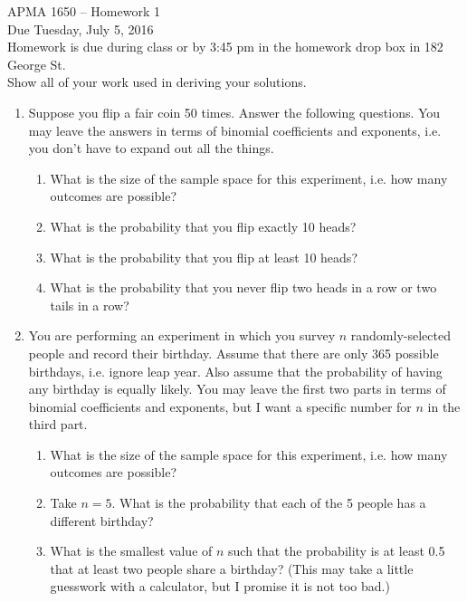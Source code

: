 \documentclass[12pt]{article}
\begin{document}
\title{}
\author{\vspace{-10ex} }

\begin{center}
{\LARGE APMA 1650 -- Homework 1}\\
\vspace{5mm}
{\large Due Tuesday, July 5, 2016}\\
\vspace{5mm}
Homework is due during class or by 3:45 pm in the homework drop box in 182 George St.\\
Show all of your work used in deriving your solutions.
\end{center}

\begin{enumerate}
\item Suppose you flip a fair coin 50 times. Answer the following questions. You may leave the answers in terms of binomial coefficients and exponents, i.e. you don't have to expand out all the things.
\begin{enumerate}
\item What is the size of the sample space for this experiment, i.e. how many outcomes are possible?
\item What is the probability that you flip exactly 10 heads?
\item What is the probability that you flip at least 10 heads?
\item What is the probability that you never flip two heads in a row or two tails in a row?
\end{enumerate}

\item You are performing an experiment in which you survey $n$ randomly-selected people and record their birthday. Assume that there are only 365 possible birthdays, i.e. ignore leap year. Also assume that the probability of having any birthday is equally likely. You may leave the first two parts in terms of binomial coefficients and exponents, but I want a specific number for $n$ in the third part.
\begin{enumerate}
\item What is the size of the sample space for this experiment, i.e. how many outcomes are possible?
\item Take $n = 5$. What is the probability that each of the 5 people has a different birthday?
\item What is the smallest value of $n$ such that the probability is at least 0.5 that at least two people share a birthday? (This may take a little guesswork with a calculator, but I promise it is not too bad.)
\end{enumerate}


\end{enumerate}
\end{document}
